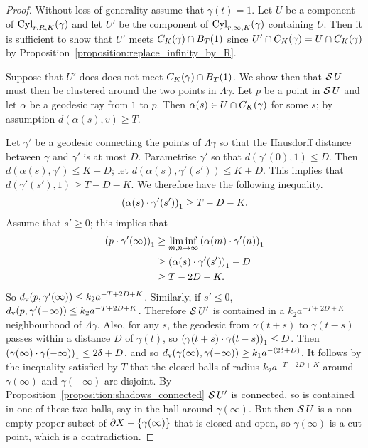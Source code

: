 \begin{proof} 
  Without loss of generality assume that $\gamma(t) = 1$.
  Let $U$ be a component of $\Cyl_{r, R, K}(\gamma)$ and let $U'$ be the component of $\Cyl_{r, \infty, K}(\gamma)$ containing $U$.
  Then it is sufficient to show that $U'$ meets $C_K(\gamma) \intersection \Ball_{T}(1)$ since $U' \intersection C_K(\gamma) = U \intersection C_K(\gamma)$ by Proposition~\ref{proposition:replace_infinity_by_R}. 

  Suppose that $U'$ does does not meet $C_K(\gamma) \intersection \Ball_{T}(1)$.
  We show then that $\shadow U$ must then be clustered around the two points in $\Lambda\gamma$.
  Let $p$ be a point in $\shadow U$ and let $\alpha$ be a geodesic ray from $1$ to $p$.
  Then $\alpha(s) \in U \intersection C_K(\gamma)$ for some $s$; by assumption $d(\alpha(s), v) \geq T$.

  Let $\gamma'$ be a geodesic connecting the points of $\Lambda\gamma$ so that the Hausdorff distance between $\gamma$ and $\gamma'$ is at most $D$.
  Parametrise $\gamma'$ so that $d(\gamma'(0), 1) \leq D$.
  Then $d(\alpha(s), \gamma') \leq K + D$; let $d(\alpha(s), \gamma'(s')) \leq K + D$.
  This implies that $d(\gamma'(s'), 1)\geq T - D - K$.
  We therefore have the following inequality.
  \begin{align}
    \gromprod[1]{\alpha(s)}{\gamma'(s')} \geq T - D - K.
  \end{align}
  Assume that $s'\geq0$; this implies that
  \begin{align}
    \gromprod[1]{p}{\gamma'(\infty)} & \geq \liminf_{m, n \to \infty}\gromprod[1]{\alpha(m)}{\gamma'(n)} \\
                                     & \geq \gromprod[1]{\alpha(s)}{\gamma'(s')} - D \\
                                     & \geq T - 2D - K.
  \end{align}
  So $d_\rmv(p, \gamma'(\infty)) \leq k_2a^{-T + 2D + K}$. 
  Similarly, if $s' \leq 0$, $d_\rmv(p, \gamma'(-\infty)) \leq k_2a^{-T + 2D + K}$. 
  Therefore $\shadow U'$ is contained in a $k_2a^{-T + 2D + K}$ neighbourhood of $\Lambda\gamma$.  
  Also, for any $s$, the geodesic from $\gamma(t+s)$ to $\gamma(t-s)$ passes within a distance $D$ of $\gamma(t)$, so $\gromprod[1]{\gamma(t+s)}{\gamma(t-s)} \leq D$. 
  Then $\gromprod[1]{\gamma(\infty)}{\gamma(-\infty)} \leq 2\delta + D$, and so $d_\rmv(\gamma(\infty), \gamma(-\infty)) \geq k_1a^{-(2\delta + D)}$. 
  It follows by the inequality satisfied by $T$ that the closed balls of radius $k_2a^{-T + 2D + K}$ around $\gamma(\infty)$ and $\gamma(-\infty)$ are disjoint. 
  By Proposition~\ref{proposition:shadows_connected} $\shadow U'$ is connected, so is contained in one of these two balls, say in the ball around $\gamma(\infty)$.  
  But then $\shadow U$ is a non-empty proper subset of $\boundary X - \{\gamma(\infty)\}$ that is closed and open, so $\gamma(\infty)$ is a cut point, which is a contradiction.
\end{proof}

